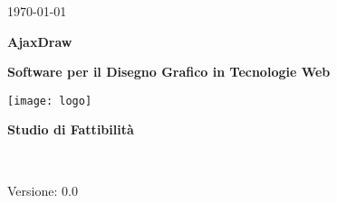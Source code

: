 
\title{\TITOLODOC}
\author{Piero Bizzotto}



\renewcommand{\insertversion}{0.0} %
\renewcommand{\TITOLODOC}{Studio di Fattibilit\`{a}} %
\renewcommand{\glosspath}{.\glossario} %

\begin{titlepage}
\begin{center}
	\begin{Large}	\today \end{Large}
\end{center}

\vspace{20pt}

\begin{center}
	\begin{Huge}
				\textbf{AjaxDraw}
	\end{Huge}
\end{center}			

\begin{center}
	\begin{large}
				\textbf{Software per il Disegno Grafico in Tecnologie Web}
	\end{large}
\end{center}			

\vspace{20pt}

\begin{center}
\texttt{[image: logo]}
\end{center}

\vspace{170pt}
\begin{center} %
	\begin{Huge}
				\textbf{\TITOLODOC}
	\end{Huge}
			\\
\end{center}
\vspace{210pt}
\begin{center}
Versione: \insertversion
\end{center}
\end{titlepage}

\newpage

